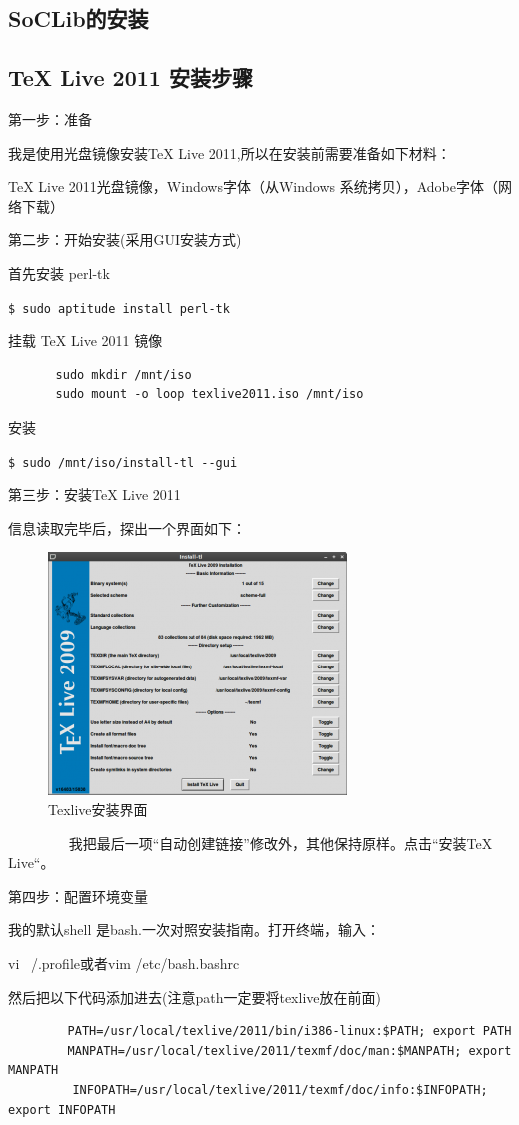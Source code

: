\subsection{SoCLib的安装}

\subsection{TeX Live 2011 安装步骤}
第一步：准备

我是使用光盘镜像安装TeX Live 2011,所以在安装前需要准备如下材料：

TeX Live 2011光盘镜像，Windows字体（从Windows 系统拷贝），Adobe字体（网络下载）

第二步：开始安装(采用GUI安装方式)

首先安装 perl-tk

\verb"$ sudo aptitude install perl-tk"

挂载 TeX Live 2011 镜像
\begin{verbatim}
　　　　sudo mkdir /mnt/iso
　　　　sudo mount -o loop texlive2011.iso /mnt/iso
\end{verbatim}

安装

\verb"$ sudo /mnt/iso/install-tl --gui"

第三步：安装TeX Live 2011

信息读取完毕后，探出一个界面如下：
\begin{figure}
\centering\includegraphics[scale=0.7]{figures/texlive.png}
\caption{Texlive安装界面}\label{texlive}
\end{figure}
　　　　
我把最后一项“自动创建链接”修改外，其他保持原样。点击“安装TeX Live“。

第四步：配置环境变量

我的默认shell 是bash.一次对照安装指南。打开终端，输入：

vi ~/.profile或者vim /etc/bash.bashrc

然后把以下代码添加进去(注意path一定要将texlive放在前面)
\begin{verbatim}
　　     PATH=/usr/local/texlive/2011/bin/i386‐linux:$PATH; export PATH
　　     MANPATH=/usr/local/texlive/2011/texmf/doc/man:$MANPATH; export MANPATH
         INFOPATH=/usr/local/texlive/2011/texmf/doc/info:$INFOPATH; export INFOPATH
\end{verbatim}

